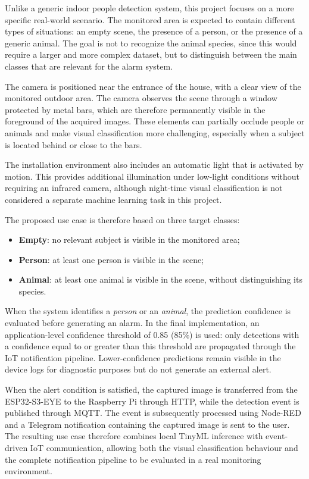 \documentclass{article}
\begin{document}
Unlike a generic indoor people detection system, this project focuses on a more specific real-world scenario. The monitored area is expected to contain different types of situations: an empty scene, the presence of a person, or the presence of a generic animal. The goal is not to recognize the animal species, since this would require a larger and more complex dataset, but to distinguish between the main classes that are relevant for the alarm system.

The camera is positioned near the entrance of the house, with a clear view
of the monitored outdoor area. The camera observes the scene through a
window protected by metal bars, which are therefore permanently visible
in the foreground of the acquired images. These elements can partially
occlude people or animals and make visual classification more challenging,
especially when a subject is located behind or close to the bars.

The installation environment also includes an automatic light that is
activated by motion. This provides additional illumination under low-light
conditions without requiring an infrared camera, although night-time visual
classification is not considered a separate machine learning task in this
project.

The proposed use case is therefore based on three target classes:
\begin{itemize}
    \item \textbf{Empty}: no relevant subject is visible in the monitored area;
    \item \textbf{Person}: at least one person is visible in the scene;
    \item \textbf{Animal}: at least one animal is visible in the scene,
without distinguishing its species.
\end{itemize}

When the system identifies a \textit{person} or an \textit{animal}, the
prediction confidence is evaluated before generating an alarm. In the final
implementation, an application-level confidence threshold of 0.85 (85\%) is used:
only detections with a confidence equal to or greater than this threshold
are propagated through the IoT notification pipeline. Lower-confidence
predictions remain visible in the device logs for diagnostic purposes but
do not generate an external alert.

When the alert condition is satisfied, the captured image is transferred
from the ESP32-S3-EYE to the Raspberry Pi through HTTP, while the detection
event is published through MQTT. The event is subsequently processed using
Node-RED and a Telegram notification containing the captured image is sent
to the user. The resulting use case therefore combines local TinyML
inference with event-driven IoT communication, allowing both the visual
classification behaviour and the complete notification pipeline to be
evaluated in a real monitoring environment.
\end{document}
